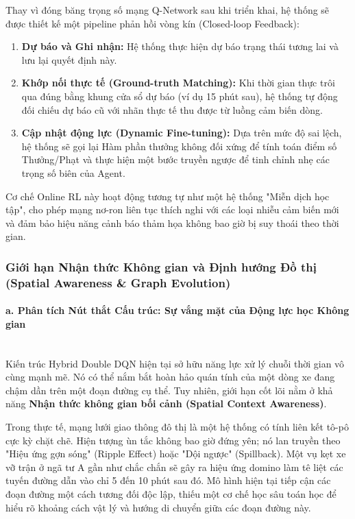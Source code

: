 Thay vì đóng băng trọng số mạng Q-Network sau khi triển khai, hệ thống sẽ được thiết kế một pipeline phản hồi vòng kín (Closed-loop Feedback):
\begin{enumerate}
    \item \textbf{Dự báo và Ghi nhận:} Hệ thống thực hiện dự báo trạng thái tương lai và lưu lại quyết định này.
    \item \textbf{Khớp nối thực tế (Ground-truth Matching):} Khi thời gian thực trôi qua đúng bằng khung cửa sổ dự báo (ví dụ 15 phút sau), hệ thống tự động đối chiếu dự báo cũ với nhãn thực tế thu được từ luồng cảm biến dòng.
    \item \textbf{Cập nhật động lực (Dynamic Fine-tuning):} Dựa trên mức độ sai lệch, hệ thống sẽ gọi lại Hàm phần thưởng không đối xứng để tính toán điểm số Thưởng/Phạt và thực hiện một bước truyền ngược để tinh chỉnh nhẹ các trọng số biên của Agent.
\end{enumerate}
Cơ chế Online RL này hoạt động tương tự như một hệ thống "Miễn dịch học tập", cho phép mạng nơ-ron liên tục thích nghi với các loại nhiễu cảm biến mới và đảm bảo hiệu năng cảnh báo thảm họa không bao giờ bị suy thoái theo thời gian.

\subsubsection{Giới hạn Nhận thức Không gian và Định hướng Đồ thị (Spatial Awareness \& Graph Evolution)}

\paragraph{a. Phân tích Nút thắt Cấu trúc: Sự vắng mặt của Động lực học Không gian} \mbox{} \\
Kiến trúc Hybrid Double DQN hiện tại sở hữu năng lực xử lý chuỗi thời gian vô cùng mạnh mẽ. Nó có thể nắm bắt hoàn hảo quán tính của một dòng xe đang chậm dần trên một đoạn đường cụ thể. Tuy nhiên, giới hạn cốt lõi nằm ở khả năng \textbf{Nhận thức không gian bối cảnh (Spatial Context Awareness)}.

Trong thực tế, mạng lưới giao thông đô thị là một hệ thống có tính liên kết tô-pô cực kỳ chặt chẽ. Hiện tượng ùn tắc không bao giờ đứng yên; nó lan truyền theo "Hiệu ứng gợn sóng" (Ripple Effect) hoặc "Dội ngược" (Spillback). Một vụ kẹt xe vỡ trận ở ngã tư A gần như chắc chắn sẽ gây ra hiệu ứng domino làm tê liệt các tuyến đường dẫn vào chỉ 5 đến 10 phút sau đó. Mô hình hiện tại tiếp cận các đoạn đường một cách tương đối độc lập, thiếu một cơ chế học sâu toán học để hiểu rõ khoảng cách vật lý và hướng di chuyển giữa các đoạn đường này.

